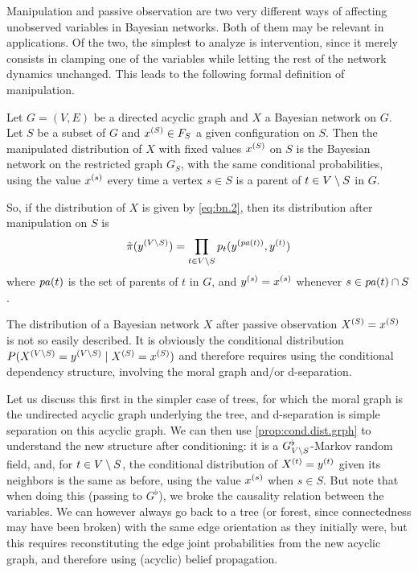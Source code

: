 Manipulation and passive observation are two very different ways of
affecting unobserved variables in Bayesian networks. Both of them may
be relevant in applications. Of the two, the simplest to analyze is
intervention, since it merely consists in clamping one of the
variables while letting the rest of the network dynamics
unchanged. This leads to the following formal definition of
manipulation.
\begin{definition}
\label{def:manip}
Let $G = (V,E)$ be a directed acyclic graph and $X$ a Bayesian network
on $G$. Let $S$ be a subset of $G$
and $x^{(S)}\in F_S$ a given configuration on $S$. Then the manipulated distribution
of $X$ with fixed values $x^{(S)}$ on $S$ is the Bayesian network on the
restricted graph $G_S$, with the same conditional probabilities, using
the value $x^{(s)}$ every time a vertex $s\in S$ is a parent of $t\in
V\setminus S$ in $G$.
\end{definition}
So, if the distribution of $X$ is given by \cref{eq:bn.2}, then its
distribution after manipulation on $S$ is 
$$
\tilde \pi(y^{(V\setminus S)}) = \prod_{t\in V\setminus S} p_t(y^{({\mathit{pa}(t)})}, y^{(t)})
$$
where ${\mathit{pa}(t)}$ is the set of parents of $t$ in $G$, and $y^{(s)}=x^{(s)}$
whenever $s\in {\mathit{pa}(t)}\cap S$.


The distribution of a Bayesian network $X$ after passive observation
$X^{(S)} = x^{(S)}$ is
not so easily described. It is obviously the conditional distribution
$P(X^{(V\setminus S)} = y^{(V\setminus S)}\mid X^{(S)} = x^{(S)})$ and therefore requires using
the conditional dependency structure, involving the moral
graph and/or d-separation.

Let us discuss this first in the simpler case of trees, for which the
moral graph is the undirected acyclic graph underlying the tree, and
d-separation is simple separation on this acyclic graph. We can then
use  \cref{prop:cond.dist.grph} to understand the new
structure after conditioning: it is a $G^\flat_{V\setminus S}$-Markov
random field, and, for $t\in V\setminus S$, the conditional distribution
of $X^{(t)} = y^{(t)}$ given its neighbors is the same as before, using the
value $x^{(s)}$ when $s\in S$. But note that when doing this (passing to $G^\flat$), we broke the
causality relation between the variables. We can however always go
back to a tree (or forest, since connectedness may have been broken) with
the same edge orientation as they initially were, but this requires
reconstituting the edge joint probabilities from the new acyclic
graph, and therefore using (acyclic) belief propagation.

